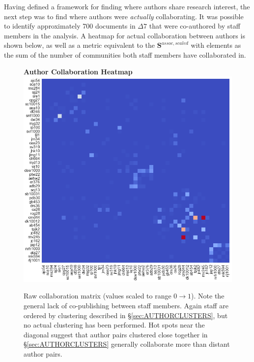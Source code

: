 Having defined a framework for finding where authors share research interest, the next step was to find where authors were \emph{actually} collaborating. It was possible to identify approximately 700 documents in $\Delta7$ that were co-authored by staff members in the analysis. A heatmap for actual collaboration between authors is shown below, as well as a metric equivalent to the $\mathbf{S}^{assoc,scaled}$ with elements as the sum of the number of communities both staff members have collaborated in.
\begin{figure}[H]
  \centering
  \textbf{Author Collaboration Heatmap}
    \includegraphics[width=\textwidth]{Analysis/raw_collabs.png}
    \caption[Author Collaboration Heatmap]{Raw collaboration matrix (values scaled to range $0 \rightarrow 1$). Note the general lack of co-publishing between staff members. Again staff are ordered by clustering described in \S\ref{sec:AUTHORCLUSTERS}, but no actual clustering has been performed. Hot spots near the diagonal suggest that author pairs clustered close together in \S\ref{sec:AUTHORCLUSTERS} generally collaborate more than distant author pairs.}
      \label{fig:rawcollabs}
  \end{figure}
